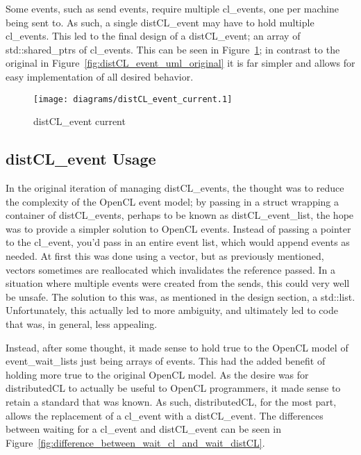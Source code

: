\documentclass[../thesis.tex]{subfiles}
\begin{document}
            Some events, such as send events, require multiple cl\_events, one per machine being sent to. As such, a single distCL\_event may have to hold multiple cl\_events. This led to the final design of a distCL\_event; an array of std::shared\_ptrs of cl\_events. This can be seen in Figure~\ref{fig:distCL_event_uml_current}; in contrast to the original in Figure~\ref{fig:distCL_event_uml_original} it is far simpler and allows for easy implementation of all desired behavior.
            
            \begin{figure}[htbp]
                \centering
                \texttt{[image: diagrams/distCL\_event\_current.1]}
                \caption{distCL\_event current}
                \label{fig:distCL_event_uml_current}
            \end{figure}


    \subsection{distCL\_event Usage} %
    \label{sub:distcl_event_usage}
        In the original iteration of managing distCL\_events, the thought was to reduce the complexity of the OpenCL event model; by passing in a struct wrapping a container of distCL\_events, perhaps to be known as distCL\_event\_list, the hope was to provide a simpler solution to OpenCL events. Instead of passing a pointer to the cl\_event, you'd pass in an entire event list, which would append events as needed. At first this was done using a vector, but as previously mentioned, vectors sometimes are reallocated which invalidates the reference passed. In a situation where multiple events were created from the sends, this could very well be unsafe. The solution to this was, as mentioned in the design section, a std::list. Unfortunately, this actually led to more ambiguity, and ultimately led to code that was, in general, less appealing.

        Instead, after some thought, it made sense to hold true to the OpenCL model of event\_wait\_lists just being arrays of events. This had the added benefit of holding more true to the original OpenCL model. As the desire was for distributedCL to actually be useful to OpenCL programmers, it made sense to retain a standard that was known. As such, distributedCL, for the most part, allows the replacement of a cl\_event with a distCL\_event. The differences between waiting for a cl\_event and distCL\_event can be seen in Figure~\ref{fig:difference_between_wait_cl_and_wait_distCL}.
\end{document}
